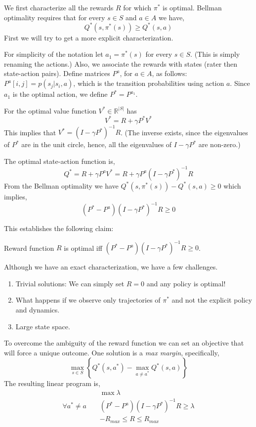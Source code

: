 We first characterize all the rewards $R$ for which $\pi^*$ is
optimal. Bellman optimality requires that for every $s\in S$ and
$a\in A$ we have,
\[
Q^*(s,\pi^*(s))\geq Q^*(s,a)
\]
First we will try to get a more explicit characterization.

For simplicity of the notation let $a_1=\pi^*(s)$ for every $s\in
S$. (This is simply renaming the actions.) Also, we associate the rewards with states (rater
then state-action pairs). Define matrices $P^a$,
for $a\in A$, as follows: $P^a[i,j]=p(s_j|s_i,a)$, which is the
transition probabilities using action $a$. Since $a_1$ is the
optimal action, we define $P^*=P^{a_1}$.

For the optimal value function $V^*\in \mathbb{R}^{|S|}$ has
\[
V^*=R+\gamma P^*V^*
\]
This implies that $V^*=(I-\gamma P^*)^{-1}R$. (The inverse exists,
since the eigenvalues of $P^*$ are in the unit circle, hence, all
the eigenvalues of $I-\gamma P^*$ are non-zero.)

The optimal state-action function is,
\[
Q^*=R+\gamma P^a V^*=R+\gamma P^a (I-\gamma P^*)^{-1}R
\]
From the Bellman optimality we have $Q^*(s,\pi^*(s))- Q^*(s,a)\geq
0$ which implies,
\[
(P^*-P^a) (I-\gamma P^*)^{-1}R\geq 0
\]

This establishes the following claim:
\begin{claim}
Reward function $R$ is optimal iff $(P^*-P^a) (I-\gamma
P^*)^{-1}R\geq 0$.
\end{claim}

Although we have an exact characterization, we have a few
challenges.
\begin{enumerate}
\item
Trivial solutions: We can simply set $R=0$ and any policy is
optimal!
\item
What happens if we observe only trajectories of $\pi^*$ and not the
explicit policy and dynamics.
\item
Large state space.
\end{enumerate}

To overcome the ambiguity of the reward function we can set an
objective that will force a unique outcome. One solution is a {\em
max margin}, specifically,
\[
\max_{s\in S} \left\{ Q^*(s,a^*)-\max_{a\neq a^*} Q^*(s,a) \right\}
\]
The resulting linear program is,\\
\begin{align*}
&\max \lambda\\
\forall a^*\neq a\;\;\;\; & (P^*-P^a) (I-\gamma P^*)^{-1}R\geq \lambda  \\
&-R_{max}\leq R\leq R_{max}
\end{align*}


